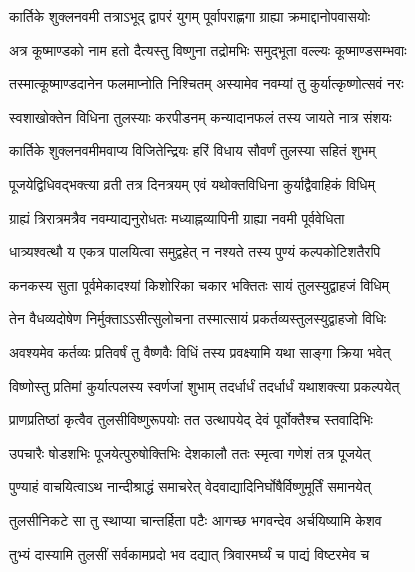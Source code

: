 

\twolineshloka
{कार्तिके शुक्लनवमी तत्राऽभूद् द्वापरं युगम्}
{पूर्वापराह्णगा ग्राह्या क्रमाद्दानोपवासयोः} %

\twolineshloka
{अत्र कूष्माण्डको नाम हतो दैत्यस्तु विष्णुना}
{तद्रोमभिः समुद्भूता वल्ल्यः कूष्माण्डसम्भवाः} %

\twolineshloka
{तस्मात्कूष्माण्डदानेन फलमाप्नोति निश्चितम्}
{अस्यामेव नवम्यां तु कुर्यात्कृष्णोत्सवं नरः} %

\twolineshloka
{स्वशाखोक्तेन विधिना तुलस्याः करपीडनम्}
{कन्यादानफलं तस्य जायते नात्र संशयः} %

\twolineshloka
{कार्तिके शुक्लनवमीमवाप्य विजितेन्द्रियः}
{हरिं विधाय सौवर्णं तुलस्या सहितं शुभम्} %

\twolineshloka
{पूजयेद्विधिवद्भक्त्या व्रती तत्र दिनत्रयम्}
{एवं यथोक्तविधिना कुर्याद्वैवाहिकं विधिम्} %

\twolineshloka
{ग्राह्यं त्रिरात्रमत्रैव नवम्याद्यनुरोधतः}
{मध्याह्नव्यापिनी ग्राह्या नवमी पूर्ववेधिता} %

\twolineshloka
{धात्र्यश्वत्थौ य एकत्र पालयित्वा समुद्वहेत्}
{न नश्यते तस्य पुण्यं कल्पकोटिशतैरपि} %

\twolineshloka
{कनकस्य सुता पूर्वमेकादश्यां किशोरिका}
{चकार भक्तितः सायं तुलस्युद्वाहजं विधिम्} %

\twolineshloka
{तेन वैधव्यदोषेण निर्मुक्ताऽऽसीत्सुलोचना}
{तस्मात्सायं प्रकर्तव्यस्तुलस्युद्वाहजो विधिः} %

\twolineshloka
{अवश्यमेव कर्तव्यः प्रतिवर्षं तु वैष्णवैः}
{विधिं तस्य प्रवक्ष्यामि यथा साङ्गा क्रिया भवेत्} %

\twolineshloka
{विष्णोस्तु प्रतिमां कुर्यात्पलस्य स्वर्णजां शुभाम्}
{तदर्धार्धं तदर्धार्धं यथाशक्त्या प्रकल्पयेत्} %

\twolineshloka
{प्राणप्रतिष्ठां कृत्वैव तुलसीविष्णुरूपयोः}
{तत उत्थापयेद् देवं पूर्वोक्तैश्च स्तवादिभिः} %

\twolineshloka
{उपचारैः षोडशभिः पूजयेत्पुरुषोक्तिभिः}
{देशकालौ ततः स्मृत्वा गणेशं तत्र पूजयेत्} %

\twolineshloka
{पुण्याहं वाचयित्वाऽथ नान्दीश्राद्धं समाचरेत्}
{वेदवाद्यादिनिर्घोषैर्विष्णुमूर्तिं समानयेत्} %

\twolineshloka
{तुलसीनिकटे सा तु स्थाप्या चान्तर्हिता पटैः}
{आगच्छ भगवन्देव अर्चयिष्यामि केशव} %

\twolineshloka
{तुभ्यं दास्यामि तुलसीं सर्वकामप्रदो भव}
{दद्यात् त्रिवारमर्घ्यं च पाद्यं विष्टरमेव च} %

